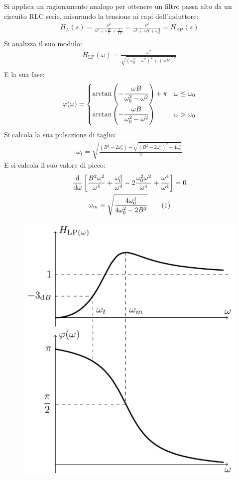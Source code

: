 \documentclass{article}
\newcommand{\df}{\mathrm{d}}
\newcommand{\tageq}{\tag{\stepcounter{equation}\theequation}}
\numberwithin{equation}{subsection}
\begin{document}
Si applica un ragionamento analogo per ottenere un filtro passa alto da un circuito RLC serie, misurando la tensione ai capi dell'induttore:
\begin{gather}
    H_{L}(s)=\displaystyle\frac{s^2}{s^2+\displaystyle s\frac{R}{L}+\frac1{LC}}=\frac{s^2}{s^2+sB+\omega_0^2}=H_{\mathrm{HP}}(s)\\
\end{gather}
Si analizza il suo modulo:
\begin{gather}
    H_{\mathrm{LP}}(\omega)=\displaystyle\frac{\omega^2}{\sqrt{(\omega_0^2-\omega^2)^2+(\omega B)^2}}\\
\end{gather}
E la sua fase:
\begin{gather}
    \varphi(\omega)=\begin{cases}
        \arctan\left(\displaystyle-\frac{\strut \omega B}{\omega_0^2-\omega^2}\right)+\pi&\omega\leq\omega_0\\
        \arctan\left(\displaystyle-\frac{\strut \omega B}{\omega_0^2-\omega^2}\right)&\omega>\omega_0
    \end{cases}
\end{gather}
Si calcola la sua pulsazione di taglio:
\begin{gather}
    \omega_t=\displaystyle\sqrt{\frac{(B^2-2\omega_0^2)+\sqrt{(B^2-2\omega_0^2)^2+4\omega_0^2}}{2}}
\end{gather}
E si calcola il suo valore di picco:
\begin{gather*}
    \displaystyle\frac{\df}{\df \omega}\left[\frac{B^2\omega^2}{\omega^4}+\frac{\omega_0^4}{\omega^4}-2\frac{\omega_0^2\omega^2}{\omega^4}+\frac{\omega^4}{\omega^4}\right]=0\\
    \omega_m=\displaystyle\sqrt{\frac{4\omega_0^4}{4\omega_0^2-2B^2}}\tageq
\end{gather*}
\begin{figure}[H]%
    \centering
    \includegraphics{passa-alto-secondo-ordine.pdf}%
\end{figure}
\end{document}
